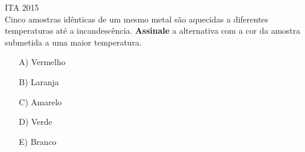 \begin{problem} [answer=E]

    ITA 2015\\
Cinco amostras idênticas de um mesmo metal são aquecidas a diferentes temperaturas até a incandescência. 
\textbf{Assinale} a alternativa com a cor da amostra submetida a uma maior temperatura. 
\begin{itemize}
    \item [A)] Vermelho
    \item [B)] Laranja
    \item [C)] Amarelo
    \item [D)] Verde
    \item [E)] Branco
\end{itemize}


\end{problem}